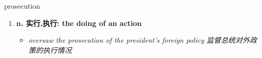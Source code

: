 
\begin{frame}
{\huge prosecution}
\begin{center}
\begin{enumerate}\Large
  \item \textbf{n. 实行,执行: the doing of an action}
  \begin{itemize}
    \item \em{\Large{oversaw the prosecution of the president's foreign policy 监督总统对外政策的执行情况}}
  \end{itemize}
\end{enumerate}
\end{center}
\end{frame}
